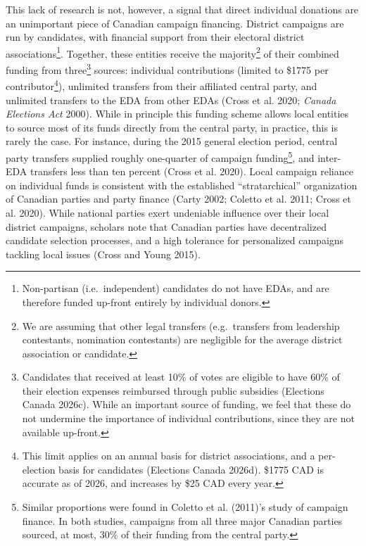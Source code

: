 \documentclass[
  letterpaper,
  DIV=11,
  numbers=noendperiod]{scrartcl}
\begin{document}
This lack of research is not, however, a signal that direct individual
donations are an unimportant piece of Canadian campaign financing.
District campaigns are run by candidates, with financial support from
their electoral district associations\footnote{Non-partisan
  (i.e.~independent) candidates do not have EDAs, and are therefore
  funded up-front entirely by individual donors.}. Together, these
entities receive the majority\footnote{We are assuming that other legal
  transfers (e.g.~transfers from leadership contestants, nomination
  contestants) are negligible for the average district association or
  candidate.} of their combined funding from three\footnote{Candidates
  that received at least 10\% of votes are eligible to have 60\% of
  their election expenses reimbursed through public subsidies (Elections
  Canada 2026c). While an important source of funding, we feel that
  these do not undermine the importance of individual contributions,
  since they are not available up-front.} sources: individual
contributions (limited to \$1775 per contributor\footnote{This limit
  applies on an annual basis for district associations, and a
  per-election basis for candidates (Elections Canada 2026d). \$1775 CAD
  is accurate as of 2026, and increases by \$25 CAD every year.}),
unlimited transfers from their affiliated central party, and unlimited
transfers to the EDA from other EDAs (Cross et al. 2020; \emph{Canada
Elections Act} 2000). While in principle this funding scheme allows
local entities to source most of its funds directly from the central
party, in practice, this is rarely the case. For instance, during the
2015 general election period, central party transfers supplied roughly
one-quarter of campaign funding\footnote{Similar proportions were found
  in Coletto et al. (2011)'s study of campaign finance. In both studies,
  campaigns from all three major Canadian parties sourced, at most, 30\%
  of their funding from the central party.}, and inter-EDA transfers
less than ten percent (Cross et al. 2020). Local campaign reliance on
individual funds is consistent with the established ``stratarchical''
organization of Canadian parties and party finance (Carty 2002; Coletto
et al. 2011; Cross et al. 2020). While national parties exert undeniable
influence over their local district campaigns, scholars note that
Canadian parties have decentralized candidate selection processes, and a
high tolerance for personalized campaigns tackling local issues (Cross
and Young 2015).
\end{document}
